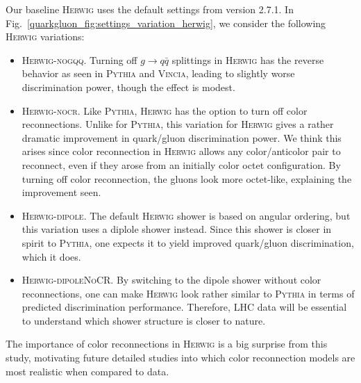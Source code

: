 \documentclass[11pt]{cernrep}
\begin{document}
Our baseline \textsc{Herwig} uses the default settings from version 2.7.1.  In Fig.~\ref{quarkgluon_fig:settings_variation_herwig}, we consider the following  \textsc{Herwig} variations:
\begin{itemize}
\item \textsc{Herwig-nogqq}.  Turning off $g \to q \bar{q}$ splittings in \textsc{Herwig} has the reverse behavior as seen in \textsc{Pythia} and \textsc{Vincia}, leading to slightly worse discrimination power, though the effect is modest.
\item \textsc{Herwig-nocr}.  Like \textsc{Pythia}, \textsc{Herwig} has the option to turn off color reconnections.  Unlike for \textsc{Pythia}, this variation for \textsc{Herwig} gives a rather dramatic improvement in quark/gluon discrimination power.  We think this arises since color reconnection in \textsc{Herwig} allows any color/anticolor pair to reconnect, even if they arose from an initially color octet configuration.  By turning off color reconnection, the gluons look more octet-like, explaining the improvement seen.
\item \textsc{Herwig-dipole}.  The default \textsc{Herwig} shower is based on angular ordering, but this variation uses a diplole shower instead.  Since this shower is closer in spirit to \textsc{Pythia}, one expects it to yield improved quark/gluon discrimination, which it does.
\item \textsc{Herwig-dipoleNoCR}.  By switching to the dipole shower without color reconnections, one can make \textsc{Herwig} look rather similar to \textsc{Pythia} in terms of predicted discrimination performance.  Therefore, LHC data will be essential to understand which shower structure is closer to nature.
\end{itemize}
The importance of color reconnections in \textsc{Herwig} is a big surprise from this study, motivating future detailed studies into which color reconnection models are most realistic when compared to data.
\end{document}

